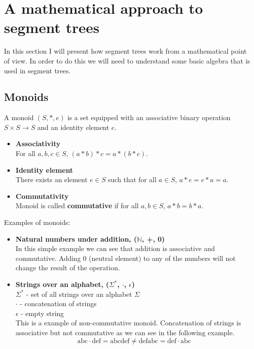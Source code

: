 \documentclass{article}
\begin{document}
\vspace{1em}


\section{A mathematical approach to segment trees}
In this section I will present how segment trees work from a mathematical point of view.
In order to do this we will need to understand some basic algebra that is used in segment trees.


\subsection{Monoids}
A monoid \( (S, \ast, e) \) is a set equipped with an associative binary operation \( S \times S \to S \) and
an identity element \(e\). 
\begin{itemize}
    \item \textbf{Associativity} \\
    For all \( a, b, c \in S \), \( (a \ast b) \ast c = a \ast (b \ast c) \).
    \item \textbf{Identity element} \\
    There exists an element \( e \in S \) such that for all \( a \in S \), \( a \ast e = e \ast a = a \).
    \item \textbf{Commutativity} \\
    Monoid is called \textbf{commutative} if for all \( a, b \in S \), \( a \ast b = b \ast a \).
\end{itemize}
Examples of monoids:
\begin{itemize}
    \item \textbf{Natural numbers under addition, (\(\mathbb{N}\), +, 0) } \\
    In this simple example we can see that addition is associative and commutative. 
    Adding 0 (neutral element) to any of the numbers will not change the result of the operation.
    \item \textbf{Strings over an alphabet, (\(\Sigma^*\), \(\cdot\), \(\epsilon\))} \\
    \(\Sigma^*\) - set of all strings over an alphabet \(\Sigma\) \\
    \(\cdot\) - concatenation of strings \\
    \(\epsilon\) - empty string \\
    This is a example of non-commutative monoid. Concatenation of strings is associative but not commutative as we can see in the following example.
    \begin{equation}
        \text{abc} \cdot \text{def} = \text{abcdef} \neq \text{defabc} = \text{def} \cdot \text{abc}
    \end{equation}
\end{itemize}
\end{document}
